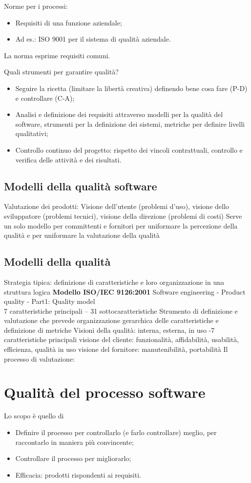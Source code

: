 Norme per i processi:
\begin{itemize}
\item Requisiti di una funzione aziendale;
\item Ad es.: ISO 9001 per il sistema di qualità aziendale.
\end{itemize}
La norma esprime requisiti comuni.

Quali strumenti per garantire qualità?
\begin{itemize}
\item Seguire la ricetta (limitare la libertà creativa) definendo bene cosa fare (P-D) e controllare (C-A);
\item Analisi e definizione dei requisiti attraverso modelli per la qualità del software, strumenti per la definizione dei sistemi, metriche per definire livelli qualitativi;
\item Controllo continuo del progetto: rispetto dei vincoli contrattuali, controllo e verifica delle attività e dei risultati.
\end{itemize}

\subsection{Modelli della qualità software}
Valutazione dei prodotti: Visione dell'utente (problemi d'uso), visione dello sviluppatore (problemi tecnici), visione della direzione (problemi di costi)
Serve un solo modello per committenti e fornitori per uniformare la percezione della qualità e per uniformare la valutazione della qualità
\subsection{Modelli della qualità}
Strategia tipica: definizione di caratteristiche e loro organizzazione in una struttura logica
\textbf{Modello ISO/IEC 9126:2001} Software engineering - Product quality - Part1: Quality model\\
7 caratteristiche principali – 31 sottocaratteristiche
Strumento di definizione e valutazione che prevede organizzazione gerarchica delle caratteristiche e definizione di metriche
Visioni della qualità: interna, esterna, in uso -7 caratteristiche principali
visione del cliente: funzionalità, affidabilità, usabilità, efficienza, qualità in uso visione del fornitore: manutenibilità, portabilità
Il processo di valutazione:


\section{Qualità del processo software}
Lo scopo è quello di
\begin{itemize}
\item  Definire il processo per controllarlo (e farlo controllare) meglio, per raccontarlo in maniera più convincente;
\item Controllare il processo per migliorarlo;
\item Efficacia: prodotti rispondenti ai requisiti.
\end{itemize}

